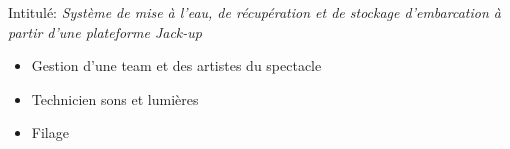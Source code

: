 \documentclass[10pt,a4paper]{../altacv}
\begin{document}
Intitulé: \emph{Système de mise à l’eau, de récupération et de stockage d’embarcation à partir d’une plateforme Jack-up}

\divider

\begin{itemize}[leftmargin=7mm]
  \item Gestion d'une team et des artistes du spectacle
  \item Technicien sons et lumières
  \item Filage
\end{itemize}






\end{document}
